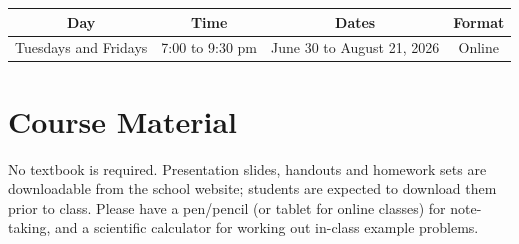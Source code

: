 \documentclass{../../oss-handout}
\begin{document}
\bgroup
\def\arraystretch{1.25}
\begin{center}
  \begin{tabular}{|c|c|c|c|}
    \rowcolor{lightgray}
    \hline
    \textbf{Day} & \textbf{Time} & \textbf{Dates} & \textbf{Format}\\
    \hline\hline
    
    Tuesdays and Fridays &
    \hspace{.1in}7:00 to 9:30 pm\hspace{.1in} &
    June 30 to August 21, 2026 &
    Online \\
    \hline   
  \end{tabular}
\end{center}
\egroup


\section{Course Material}

No textbook is required. Presentation slides, handouts and homework sets are
downloadable from the school website; students are expected to download them
prior to class. Please have a pen/pencil (or tablet for online classes) for
note-taking, and a scientific calculator for working out in-class example
problems.



\end{document}
